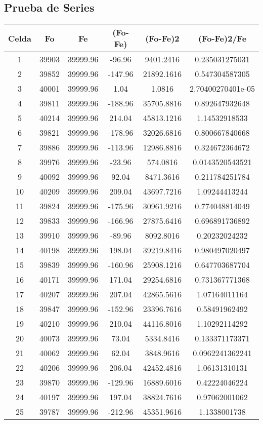 \documentclass{article}
\begin{document}
\subsection{Prueba de Series}
\begin{tabular}{|c|c|c|c|c|c|}
Celda&Fo&Fe&(Fo{-}Fe)&(Fo{-}Fe)2&(Fo{-}Fe)2/Fe\\
\hline
1&39903&39999.96&{-}96.96&9401.2416&0.235031275031\\
\hline
2&39852&39999.96&{-}147.96&21892.1616&0.547304587305\\
\hline
3&40001&39999.96&1.04&1.0816&2.70400270401e{-}05\\
\hline
4&39811&39999.96&{-}188.96&35705.8816&0.892647932648\\
\hline
5&40214&39999.96&214.04&45813.1216&1.14532918533\\
\hline
6&39821&39999.96&{-}178.96&32026.6816&0.800667840668\\
\hline
7&39886&39999.96&{-}113.96&12986.8816&0.324672364672\\
\hline
8&39976&39999.96&{-}23.96&574.0816&0.0143520543521\\
\hline
9&40092&39999.96&92.04&8471.3616&0.211784251784\\
\hline
10&40209&39999.96&209.04&43697.7216&1.09244413244\\
\hline
11&39824&39999.96&{-}175.96&30961.9216&0.774048814049\\
\hline
12&39833&39999.96&{-}166.96&27875.6416&0.696891736892\\
\hline
13&39910&39999.96&{-}89.96&8092.8016&0.20232024232\\
\hline
14&40198&39999.96&198.04&39219.8416&0.980497020497\\
\hline
15&39839&39999.96&{-}160.96&25908.1216&0.647703687704\\
\hline
16&40171&39999.96&171.04&29254.6816&0.731367771368\\
\hline
17&40207&39999.96&207.04&42865.5616&1.07164011164\\
\hline
18&39847&39999.96&{-}152.96&23396.7616&0.58491962492\\
\hline
19&40210&39999.96&210.04&44116.8016&1.10292114292\\
\hline
20&40073&39999.96&73.04&5334.8416&0.133371173371\\
\hline
21&40062&39999.96&62.04&3848.9616&0.0962241362241\\
\hline
22&40206&39999.96&206.04&42452.4816&1.06131310131\\
\hline
23&39870&39999.96&{-}129.96&16889.6016&0.42224046224\\
\hline
24&40197&39999.96&197.04&38824.7616&0.97062001062\\
\hline
25&39787&39999.96&{-}212.96&45351.9616&1.1338001738\\
\end{tabular}
\end{document}
